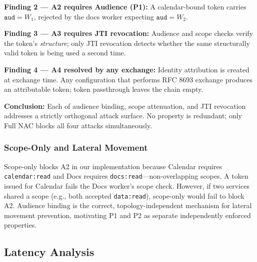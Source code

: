 \documentclass[journal]{IEEEtran}
\begin{document}
\textbf{Finding 2 — A2 requires Audience (P1):} A calendar-bound token carries
$\texttt{aud}=W_1$, rejected by the docs worker expecting $\texttt{aud}=W_2$.

\textbf{Finding 3 — A3 requires JTI revocation:} Audience and scope checks
verify the token's \textit{structure}; only JTI revocation detects whether the
same structurally valid token is being used a second time.

\textbf{Finding 4 — A4 resolved by any exchange:} Identity attribution is
created at exchange time. Any configuration that performs RFC 8693 exchange
produces an attributable token; token passthrough leaves the chain empty.

\textbf{Conclusion:} Each of audience binding, scope attenuation, and JTI
revocation addresses a strictly orthogonal attack surface. No property is
redundant; only Full NAC blocks all four attacks simultaneously.

\subsubsection{Scope-Only and Lateral Movement}
\label{sec:scope_caveat}
Scope-only blocks A2 in our implementation because Calendar requires
\texttt{calendar:read} and Docs requires \texttt{docs:read}---non-overlapping
scopes. A token issued for Calendar fails the Docs worker's scope check.
However, if two services shared a scope (e.g., both accepted \texttt{data:read}),
scope-only would fail to block A2. Audience binding is the correct,
topology-independent mechanism for lateral movement prevention, motivating P1
and P2 as separate independently enforced properties.

\subsection{Latency Analysis}

\begin{table}[h]
\caption{End-to-end latency of \texttt{prepare\_daily\_briefing} ($N=30$)}
\label{tab:latency}
\centering
\footnotesize
\setlength{\tabcolsep}{3pt}
\end{table}
\end{document}
